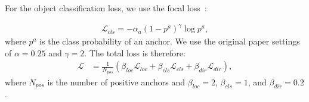 \documentclass[10pt,twocolumn,letterpaper]{article}
\newcommand{\squeeze}{\vspace{-0.5mm}}
\begin{document}
For the object classification loss, we use the focal loss~\cite{retinanet}:

\begin{eqnarray*}
\mathcal{L}_{cls}= -\alpha_a \left(1 - p^a\right) ^ \gamma \log p^a,
\end{eqnarray*}
\squeeze
where $p^a$ is the class probability of an anchor.
We use the original paper settings of $\alpha=0.25$ and $\gamma=2$.
The total loss is therefore: 
\squeeze
\begin{eqnarray*}
\mathcal{L} &= \frac{1}{N_{pos}}\left(\beta_{loc} \mathcal{L}_{loc} + \beta_{cls} \mathcal{L}_{cls}  + \beta_{dir} \mathcal{L}_{dir}\right),
\end{eqnarray*}
\squeeze
where $N_{pos}$ is the number of positive anchors and $\beta_{loc}=2$, $\beta_{cls}=1$, and $\beta_{dir}=0.2$.
\end{document}
